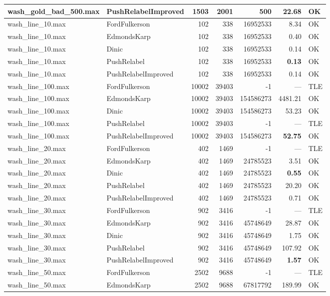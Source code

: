 \begin{longtable}{llrrrrl}
wash\_gold\_bad\_500.max & PushRelabelImproved & 1503 & 2001 & 500 & 22.68 & OK \\
\midrule
wash\_line\_10.max & FordFulkerson & 102 & 338 & 16952533 & 8.34 & OK \\
wash\_line\_10.max & EdmondsKarp & 102 & 338 & 16952533 & 0.40 & OK \\
wash\_line\_10.max & Dinic & 102 & 338 & 16952533 & 0.14 & OK \\
wash\_line\_10.max & PushRelabel & 102 & 338 & 16952533 & \textbf{0.13} & OK \\
wash\_line\_10.max & PushRelabelImproved & 102 & 338 & 16952533 & 0.14 & OK \\
\midrule
wash\_line\_100.max & FordFulkerson & 10002 & 39403 & -1 & --- & TLE \\
wash\_line\_100.max & EdmondsKarp & 10002 & 39403 & 154586273 & 4481.21 & OK \\
wash\_line\_100.max & Dinic & 10002 & 39403 & 154586273 & 53.23 & OK \\
wash\_line\_100.max & PushRelabel & 10002 & 39403 & -1 & --- & TLE \\
wash\_line\_100.max & PushRelabelImproved & 10002 & 39403 & 154586273 & \textbf{52.75} & OK \\
\midrule
wash\_line\_20.max & FordFulkerson & 402 & 1469 & -1 & --- & TLE \\
wash\_line\_20.max & EdmondsKarp & 402 & 1469 & 24785523 & 3.51 & OK \\
wash\_line\_20.max & Dinic & 402 & 1469 & 24785523 & \textbf{0.55} & OK \\
wash\_line\_20.max & PushRelabel & 402 & 1469 & 24785523 & 20.20 & OK \\
wash\_line\_20.max & PushRelabelImproved & 402 & 1469 & 24785523 & 0.71 & OK \\
\midrule
wash\_line\_30.max & FordFulkerson & 902 & 3416 & -1 & --- & TLE \\
wash\_line\_30.max & EdmondsKarp & 902 & 3416 & 45748649 & 28.87 & OK \\
wash\_line\_30.max & Dinic & 902 & 3416 & 45748649 & 1.75 & OK \\
wash\_line\_30.max & PushRelabel & 902 & 3416 & 45748649 & 107.92 & OK \\
wash\_line\_30.max & PushRelabelImproved & 902 & 3416 & 45748649 & \textbf{1.57} & OK \\
\midrule
wash\_line\_50.max & FordFulkerson & 2502 & 9688 & -1 & --- & TLE \\
wash\_line\_50.max & EdmondsKarp & 2502 & 9688 & 67817792 & 189.99 & OK \\

\end{longtable}
